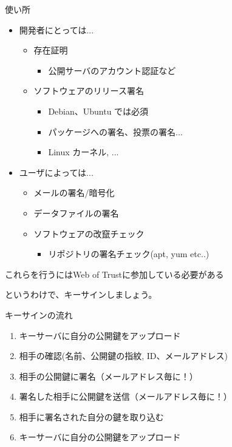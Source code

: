 \documentclass[cjk,dvipdfmx,12pt,compress]{beamer}
\begin{document}
\begin{frame}{使い所}
\begin{itemize}
  \item 開発者にとっては...
    \begin{itemize}
    \item 存在証明
      \begin{itemize}
      \item 公開サーバのアカウント認証など
      \end{itemize}
    \item ソフトウェアのリリース署名
      \begin{itemize}
      \item Debian、Ubuntu では必須
      \item パッケージへの署名、投票の署名...
      \item Linux カーネル, ...
      \end{itemize}
    \end{itemize}
  \item ユーザによっては...
    \begin{itemize}
    \item メールの署名/暗号化
    \item データファイルの署名
    \item ソフトウェアの改竄チェック
      \begin{itemize}
      \item リポジトリの署名チェック(apt, yum etc..)
      \end{itemize}
    \end{itemize}
  \end{itemize}
  \pause
  \begin{center}
    これらを行うには\alert{Web of Trust}に参加している必要がある
  \end{center}
  \vspace{2.5em}
\end{frame}


\begin{frame}
  \begin{center}
    {\Huge\alert{というわけで、キーサインしましょう。}}
  \end{center}
\end{frame}


\begin{frame}{キーサインの流れ}
\begin{enumerate}
  \item キーサーバに自分の公開鍵をアップロード
  \item 相手の確認(名前、公開鍵の指紋, ID、メールアドレス)
  \item 相手の公開鍵に署名（メールアドレス毎に！）
  \item 署名した相手に公開鍵を送信（メールアドレス毎に！）
  \item 相手に署名された自分の鍵を取り込む
  \item キーサーバに自分の公開鍵をアップロード
\end{enumerate}
\end{frame}
\end{document}
